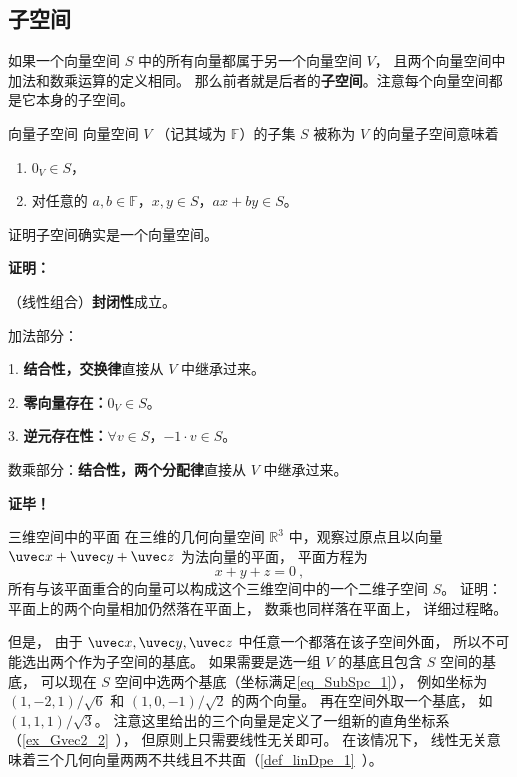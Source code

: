 
\begin{issues}
\issueDraft
\end{issues}


\subsection{子空间}

如果一个向量空间 $S$ 中的所有向量都属于另一个向量空间 $V$， 且两个向量空间中加法和数乘运算的定义相同。 那么前者就是后者的\textbf{子空间}。注意每个向量空间都是它本身的子空间。

\begin{definition}{向量子空间}
向量空间 $V$ （记其域为 $\mathbb{F}$）的子集 $S$ 被称为 $V$ 的向量子空间意味着
\begin{enumerate}
\item $0_V \in S$，
\item 对任意的 $a, b \in \mathbb{F}$，$x, y \in S$，$a x + b y \in S$。
\end{enumerate}
\end{definition}

\begin{theorem}{}
证明子空间确实是一个向量空间。
\end{theorem}
\textbf{证明：}

（线性组合）\textbf{封闭性}成立。 

加法部分：

1. \textbf{结合性，交换律}直接从 $V$ 中继承过来。

2. \textbf{零向量存在：}$0_V \in S$。

3. \textbf{逆元存在性：}$\forall v \in S$，$-1 \cdot v \in S$。

数乘部分：\textbf{结合性，两个分配律}直接从 $V$ 中继承过来。

\textbf{证毕！}

\begin{example}{三维空间中的平面}
在三维的几何向量空间 $\mathbb{R}^3$ 中，观察过原点且以向量 $\uvec x + \uvec y + \uvec z$ 为法向量的平面， 平面方程为
\begin{equation}\label{eq_SubSpc_1}
x + y + z = 0~,
\end{equation}
所有与该平面重合的向量可以构成这个三维空间中的一个二维子空间 $S$。 证明： 平面上的两个向量相加仍然落在平面上， 数乘也同样落在平面上， 详细过程略。 

但是， 由于 $\uvec x, \uvec y, \uvec z$ 中任意一个都落在该子空间外面， 所以不可能选出两个作为子空间的基底。 如果需要是选一组 $V$ 的基底且包含 $S$ 空间的基底， 可以现在 $S$ 空间中选两个基底（坐标满足\autoref{eq_SubSpc_1}）， 例如坐标为 $(1, -2, 1)/\sqrt{6}$ 和 $(1, 0, -1)/\sqrt{2}$ 的两个向量。 再在空间外取一个基底， 如 $(1, 1, 1)/\sqrt{3}$。 注意这里给出的三个向量是定义了一组新的直角坐标系（\autoref{ex_Gvec2_2}~）， 但原则上只需要线性无关即可。 在该情况下， 线性无关意味着三个几何向量两两不共线且不共面（\autoref{def_linDpe_1}~）。
\end{example}

